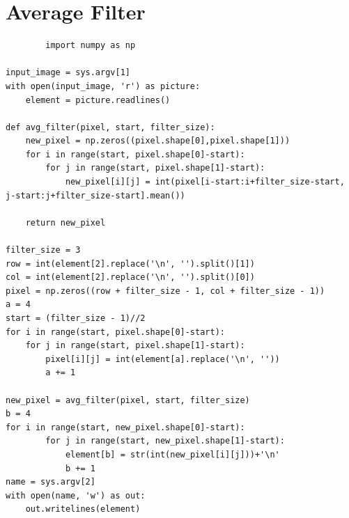 \documentclass[a4paper,8pt]{article}
\begin{document}
        \section{Average Filter}
        \begin{verbatim}
        import numpy as np

input_image = sys.argv[1]
with open(input_image, 'r') as picture:
    element = picture.readlines()

def avg_filter(pixel, start, filter_size):
    new_pixel = np.zeros((pixel.shape[0],pixel.shape[1]))
    for i in range(start, pixel.shape[0]-start):
        for j in range(start, pixel.shape[1]-start):
            new_pixel[i][j] = int(pixel[i-start:i+filter_size-start, j-start:j+filter_size-start].mean())

    return new_pixel

filter_size = 3
row = int(element[2].replace('\n', '').split()[1])
col = int(element[2].replace('\n', '').split()[0])
pixel = np.zeros((row + filter_size - 1, col + filter_size - 1))
a = 4
start = (filter_size - 1)//2
for i in range(start, pixel.shape[0]-start):
    for j in range(start, pixel.shape[1]-start):
        pixel[i][j] = int(element[a].replace('\n', ''))
        a += 1

new_pixel = avg_filter(pixel, start, filter_size)
b = 4
for i in range(start, new_pixel.shape[0]-start):
        for j in range(start, new_pixel.shape[1]-start):
            element[b] = str(int(new_pixel[i][j]))+'\n'
            b += 1
name = sys.argv[2]
with open(name, 'w') as out:
    out.writelines(element)

        \end{verbatim}
        
\end{document}
